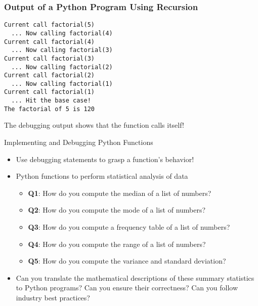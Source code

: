 \documentclass[14pt,aspectratio=169]{beamer}
\begin{document}
%
\begin{frame}[fragile]
  \frametitle{Output of a Python Program Using Recursion}
  \normalsize
  \begin{minipage}{6in}
    \vspace*{.25in}
    \begin{verbatim}
Current call factorial(5)
  ... Now calling factorial(4)
Current call factorial(4)
  ... Now calling factorial(3)
Current call factorial(3)
  ... Now calling factorial(2)
Current call factorial(2)
  ... Now calling factorial(1)
Current call factorial(1)
  ... Hit the base case!
The factorial of 5 is 120
    \end{verbatim}
  \end{minipage}
  \vspace*{.05in}
  \begin{center}
    \normalsize \noindent The debugging output shows that the function calls
    itself!\\
  \end{center}
\end{frame}


%
\begin{frame}{Implementing and Debugging Python Functions}
  \begin{itemize}
    \item Use debugging statements to grasp a function's behavior!
      \vspace*{-.15in}
    \item Python functions to perform statistical analysis of data
      \begin{itemize}
        \item {\bf Q1}: How do you compute the median of a list of numbers?
        \item {\bf Q2}: How do you compute the mode of a list of numbers?
        \item {\bf Q3}: How do you compute a frequency table of a list of
          numbers?
        \item {\bf Q4}: How do you compute the range of a list of numbers?
        \item {\bf Q5}: How do you compute the variance and standard deviation?
      \end{itemize}
      \vspace*{-.2in}
    \item Can you translate the mathematical descriptions of these summary
      statistics to Python programs? Can you ensure their correctness? Can you
      follow industry best practices?
  \end{itemize}
\end{frame}
\end{document}
